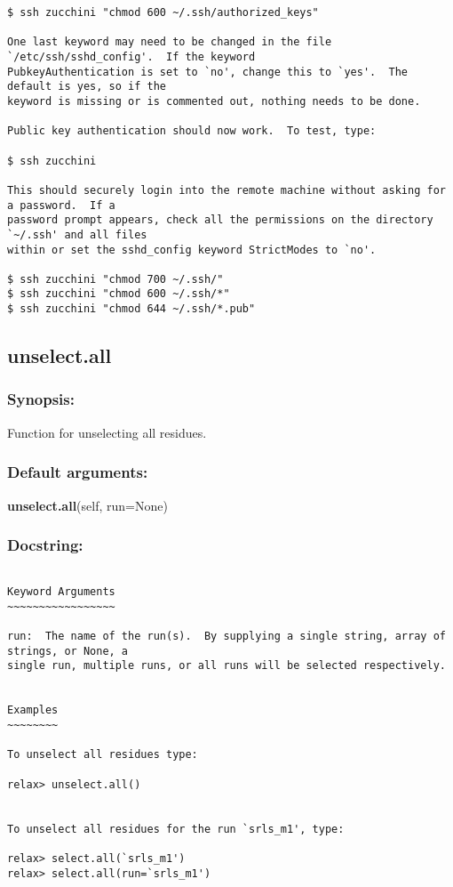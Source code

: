 {\begin{verbatim}
$ ssh zucchini "chmod 600 ~/.ssh/authorized_keys"

One last keyword may need to be changed in the file `/etc/ssh/sshd_config'.  If the keyword
PubkeyAuthentication is set to `no', change this to `yes'.  The default is yes, so if the
keyword is missing or is commented out, nothing needs to be done.

Public key authentication should now work.  To test, type:

$ ssh zucchini

This should securely login into the remote machine without asking for a password.  If a
password prompt appears, check all the permissions on the directory `~/.ssh' and all files
within or set the sshd_config keyword StrictModes to `no'.

$ ssh zucchini "chmod 700 ~/.ssh/"
$ ssh zucchini "chmod 600 ~/.ssh/*"
$ ssh zucchini "chmod 644 ~/.ssh/*.pub"
\end{verbatim}
}



\newpage

\subsection{unselect.all}


\subsubsection{Synopsis:}

Function for unselecting all residues.

\subsubsection{Default arguments:}

\textsf{\textbf{unselect.all}(self, run=None)
}


\subsubsection{Docstring:}

{\scriptsize
\begin{verbatim}

Keyword Arguments
~~~~~~~~~~~~~~~~~

run:  The name of the run(s).  By supplying a single string, array of strings, or None, a
single run, multiple runs, or all runs will be selected respectively.


Examples
~~~~~~~~

To unselect all residues type:

relax> unselect.all()


To unselect all residues for the run `srls_m1', type:

relax> select.all(`srls_m1')
relax> select.all(run=`srls_m1')
\end{verbatim}
}



